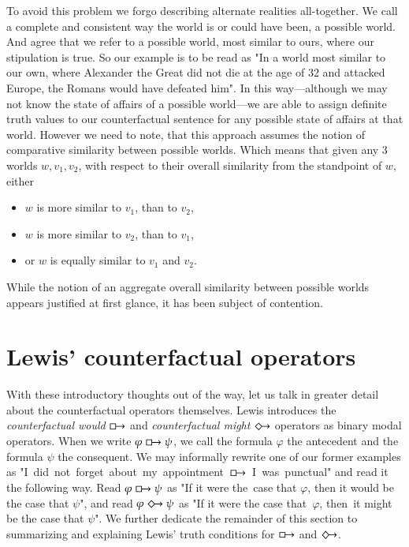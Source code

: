\documentclass[a4paper,american,10pt]{paper}
\theoremstyle{definition}\newtheorem{definition}{Definition}
\begin{document}
To avoid this problem we forgo describing alternate realities all-together. We call a complete and consistent way the world is or could have been, a possible world. And agree that we refer to a possible world, most similar to ours, where our stipulation is true. So our example is to be read as "In a world most similar to our own, where Alexander the Great did not die at the age of 32 and attacked Europe, the Romans would have defeated him". In this way---although we may not know the state of affairs of a possible world---we are able to assign definite truth values to our counterfactual sentence for any possible state of affairs at that world. However we need to note, that this approach assumes the notion of comparative similarity between possible worlds. Which means that given any 3 worlds $w,v_1,v_2$, with respect to their overall similarity from the standpoint of $w$, either
\begin{itemize}
\item $w$ is more similar to $v_1$, than to $v_2$,
\item $w$ is more similar to $v_2$, than to $v_1$,
\item or $w$ is equally similar to $v_1$ and $v_2$.
\end{itemize}
While the notion of an aggregate overall similarity between possible worlds appears justified at first glance, it has been subject of contention. \cite{morreau_overall_similarity_2010}
\newpage
\section{Lewis' counterfactual operators}\label{sec:lew_cf_ops}
With these introductory thoughts out of the way, let us talk in greater detail about the counterfactual operators themselves. Lewis introduces the\textit{ counterfactual would} $\boxright$ and \textit{counterfactual might} $\Diamondright$ operators as binary modal operators. \cite{lewis_counterfactuals_1973} When we write $\varphi\boxright\psi$, we call the formula $\varphi$ the antecedent and the formula $\psi$ the consequent. We may informally rewrite one of our former examples as "I~did~not~forget~about~my~appointment~$\boxright$~I~was~punctual" and read it the following way. Read $\varphi\boxright\psi$ as "If it were the~case that $\varphi$, then it would be the case that $\psi$", and read $\varphi\Diamondright\psi$ as "If it were the case that~$\varphi$, then~it might be the case that $\psi$". We further dedicate the remainder of this section to summarizing and explaining Lewis' truth conditions for $\boxright$ and $\Diamondright$.
\end{document}
